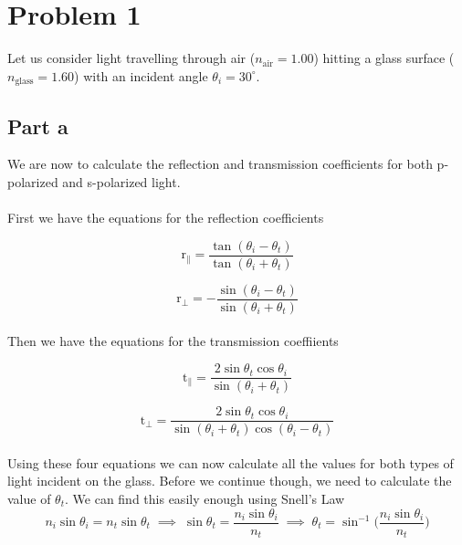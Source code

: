 	\section*{Problem 1}
	
	Let us consider light travelling through air ($n_{\mathrm{air}} = 1.00$)  hitting a glass surface ($n_{\mathrm{glass}} = 1.60$) with an incident angle
	$\theta_i = 30^{\circ}$. 
	
	\subsection*{Part a}
	
	We are now to calculate the reflection and transmission coefficients for both p-polarized and s-polarized light.
	\\
	\\
	First we have the equations for the reflection coefficients
	
	\begin{equation} \label{r_par}
		\mathrm{r}_\parallel = \dfrac{\tan (\theta_i - \theta_t)}{\tan (\theta_i + \theta_t)}
	\end{equation}
	
	\begin{equation} \label{r_per}
		\mathrm{r}_\bot = -\dfrac{\sin (\theta_i - \theta_t)}{\sin (\theta_i + \theta_t)}
	\end{equation}
	\\
	Then we have the equations for the transmission coeffiients
	
	\begin{equation} \label{t_par}
		\mathrm{t}_\parallel = \dfrac{2\sin\theta_t\cos\theta_i}{\sin(\theta_i + \theta_t)}
	\end{equation}
	
	\begin{equation} \label{t_per}
		\mathrm{t}_\bot = \dfrac{2\sin\theta_t\cos\theta_i}{\sin(\theta_i + \theta_t)\cos(\theta_i - \theta_t)}
	\end{equation}
	\\
	Using these four equations we can now calculate all the values for both types of light incident on the glass. Before we continue though, we need
	to calculate the value of $\theta_t$. We can find this easily enough using Snell's Law
	\begin{equation*}
		n_i \sin \theta_i = n_t \sin \theta_t \; \implies 
		\; \sin \theta_t = \dfrac{n_i \sin\theta_i}{n_t} \; \implies 
		\; \theta_t = \sin^{-1}\Big(\dfrac{n_i \sin\theta_i}{n_t}\Big)
	\end{equation*}
	
